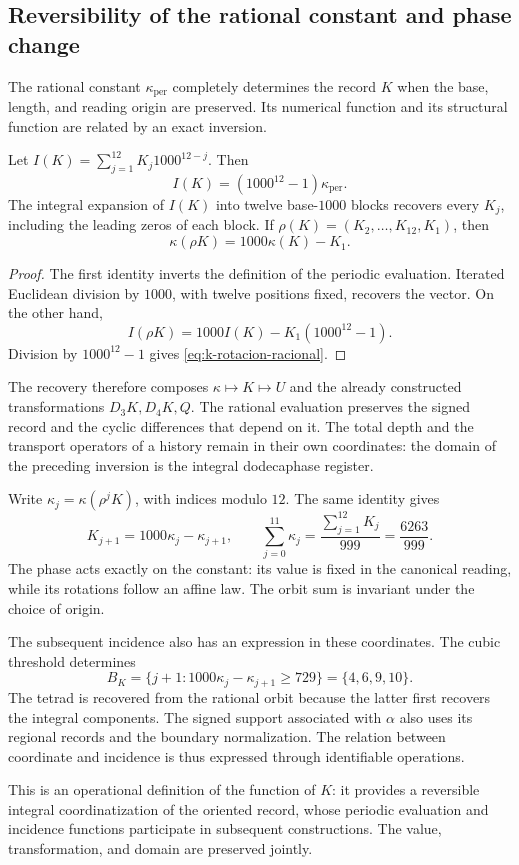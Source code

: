 \subsection{Reversibility of the rational constant and phase change}

The rational constant \(\kappa_{\mathrm{per}}\) completely determines
the record \(K\) when the base, length, and reading origin are preserved.
Its numerical function and its structural function are related by an
exact inversion.

\begin{proposition}
Let \(I(K)=\sum_{j=1}^{12}K_j1000^{12-j}\). Then
\[
 I(K)=(1000^{12}-1)\kappa_{\mathrm{per}}.
\]
The integral expansion of \(I(K)\) into twelve base-\(1000\) blocks
recovers every \(K_j\), including the leading zeros of each block.
If \(\rho(K)=(K_2,\ldots,K_{12},K_1)\), then
\begin{equation}
 \kappa(\rho K)=1000\kappa(K)-K_1.
 \label{eq:k-rotacion-racional}
\end{equation}
\end{proposition}
\begin{proof}
The first identity inverts the definition of the periodic evaluation.
Iterated Euclidean division by \(1000\), with twelve positions fixed,
recovers the vector. On the other hand,
\[
 I(\rho K)=1000I(K)-K_1(1000^{12}-1).
\]
Division by \(1000^{12}-1\) gives \eqref{eq:k-rotacion-racional}.
\end{proof}

The recovery therefore composes \(\kappa\mapsto K\mapsto U\)
and the already constructed transformations \(D_3K,D_4K,Q\). The rational
evaluation preserves the signed record and the cyclic differences that
depend on it. The total depth and the transport operators of a history
remain in their own coordinates: the domain of the preceding inversion
is the integral dodecaphase register.

Write \(\kappa_j=\kappa(\rho^jK)\), with indices modulo \(12\).
The same identity gives
\[
 K_{j+1}=1000\kappa_j-\kappa_{j+1},\qquad
 \sum_{j=0}^{11}\kappa_j=\frac{\sum_{j=1}^{12}K_j}{999}
 =\frac{6263}{999}.
\]
The phase acts exactly on the constant: its value is fixed
in the canonical reading, while its rotations follow an affine law.
The orbit sum is invariant under the choice of origin.

The subsequent incidence also has an expression in these
coordinates. The cubic threshold determines
\[
 B_K=\{j+1:1000\kappa_j-\kappa_{j+1}\ge729\}
 =\{4,6,9,10\}.
\]
The tetrad is recovered from the rational orbit because the latter
first recovers the integral components. The signed support associated
with \(\alpha\) also uses its regional records and the boundary
normalization. The relation between coordinate and incidence is thus
expressed through identifiable operations.

This is an operational definition of the function of \(K\): it provides
a reversible integral coordinatization of the oriented record, whose
periodic evaluation and incidence functions participate in subsequent
constructions. The value, transformation, and domain are preserved jointly.
